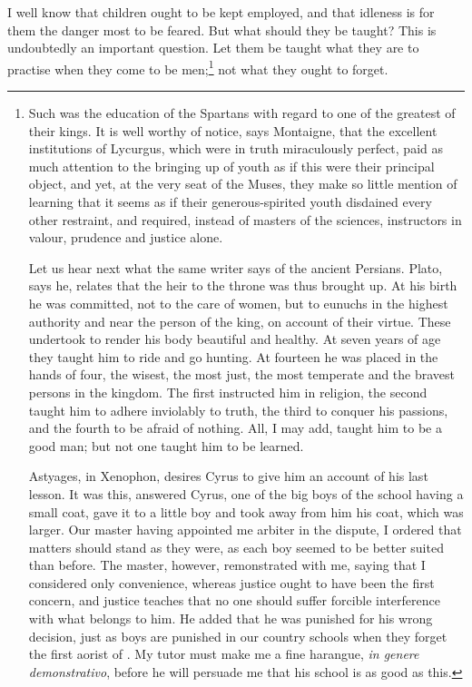 I well know that children ought to be kept employed, and that idleness
is for them the danger most to be feared. But what should they be
taught? This is undoubtedly an  important question. Let them
be taught what they are to practise when they come to be
men;\footnote{Such was the education of the Spartans with regard to
one of the greatest of their kings. It is well worthy of notice, says
Montaigne, that the excellent institutions of Lycurgus, which were in
truth miraculously perfect, paid as much attention to the bringing up
of youth as if this were their principal object, and yet, at the very
seat of the Muses, they make so little mention of learning that it
seems as if their generous-spirited youth disdained every other
restraint, and required, instead of masters of the sciences,
instructors in valour, prudence and justice alone.

Let us hear next what the same writer says of the ancient Persians.
Plato, says he, relates that the heir to the throne was thus brought
up. At his birth he was committed, not to the care of women, but to
eunuchs in the highest authority and near the person of the king, on
account of their virtue. These undertook to render his body beautiful
and healthy. At seven years of age they taught him to ride and go
hunting. At fourteen he was placed in the hands of four, the wisest,
the most just, the most temperate and the bravest persons in the
kingdom. The first instructed him in religion, the second taught him
to adhere inviolably to truth, the third to conquer his passions, and
the fourth to be afraid of nothing. All, I may add, taught him to be a
good man; but not one taught him to be learned.

Astyages, in Xenophon, desires Cyrus to give him an account of his
last lesson. It was this, answered Cyrus, one of the big boys of the
school having a small coat, gave it to a little boy and took away from
him his coat, which was larger. Our master having appointed me arbiter
in the dispute, I ordered that matters should stand as they were, as
each boy seemed to be better suited than before. The master, however,
remonstrated with me, saying that I considered only convenience,
whereas justice ought to have been the first concern, and justice
teaches that no one should suffer forcible interference with what
belongs to him. He added that he was punished for his wrong decision,
just as boys are punished in our country schools when they forget the
first aorist of . My tutor must make me a fine harangue,
\textit{in genere demonstrativo}, before he will persuade me that his
school is as good as this.} not what they ought to forget.

